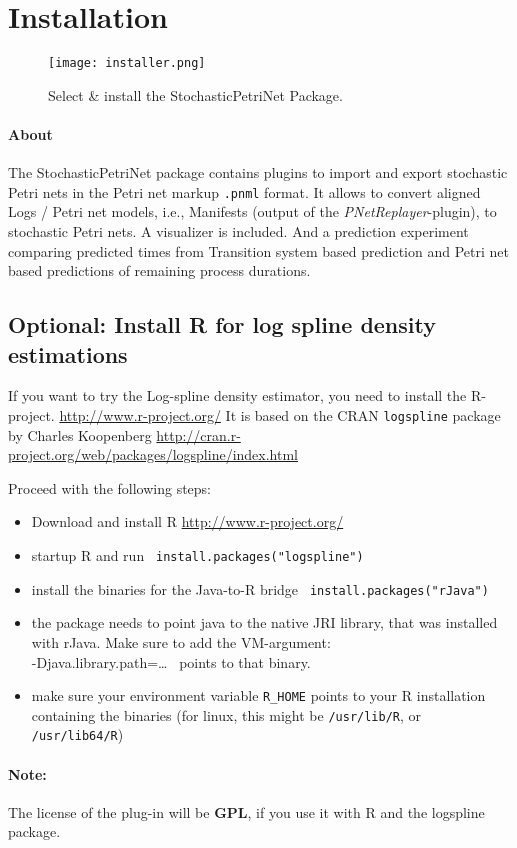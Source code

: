 \chapter*{Installation}
\label{chap:installation}
\begin{figure}[H]
\texttt{[image: installer.png]}
\caption{Select \& install the StochasticPetriNet Package.}
\label{fig:installation}
\end{figure}


\subsubsection*{About}
The StochasticPetriNet package contains plugins to import and export stochastic Petri nets in the Petri net markup \texttt{.pnml} format.
It allows to convert aligned Logs / Petri net models, i.e., Manifests (output of the \emph{PNetReplayer}-plugin), to stochastic Petri nets.
A visualizer is included. And a prediction experiment comparing predicted times from Transition system based prediction and Petri net based predictions of remaining process durations.

\pagebreak
\section*{Optional: Install R for log spline density estimations}
\label{sec:optional} 
If you want to try the Log-spline density estimator, you need to install the R-project. \url{http://www.r-project.org/}
It is based on the CRAN \texttt{logspline} package by Charles Koopenberg \url{http://cran.r-project.org/web/packages/logspline/index.html}

Proceed with the following steps:
\begin{itemize}
  \item Download and install R \url{http://www.r-project.org/}
  \item startup R and run \texttt{ install.packages("logspline")}
  \item install the binaries for the Java-to-R bridge \texttt{ install.packages("rJava")}
  \item the \mypackagename package needs to point java to the native JRI library, that was installed with rJava. Make sure to add the VM-argument:\\
  -Djava.library.path=\ldots~ points to that binary. 
  \item make sure your environment variable \texttt{R\_HOME} points to your R installation containing the binaries (for linux, this might be \texttt{/usr/lib/R}, or \texttt{/usr/lib64/R})
\end{itemize}

\subsubsection{Note:}
The license of the plug-in will be \textbf{GPL}, if you use it with R and the logspline package.
